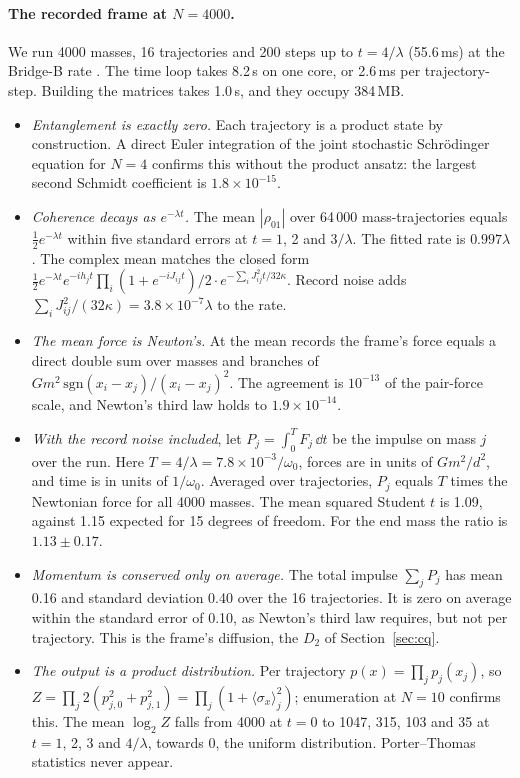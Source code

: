\paragraph{The recorded frame at $N=4000$.} We run 4000 masses, 16 trajectories and 200 steps up to $t=4/\lambda$ (55.6\,ms) at the Bridge-B
rate . The time loop takes 8.2\,s on one core, or 2.6\,ms per trajectory-step. Building the matrices takes 1.0\,s, and they
occupy 384\,MB.
\begin{itemize}[nosep]
\item \emph{Entanglement is exactly zero.} Each trajectory is a product state by construction. A direct Euler integration of the joint
stochastic Schr\"odinger equation for $N=4$ confirms this without the product ansatz: the largest second Schmidt coefficient is
$1.8\times10^{-15}$.
\item \emph{Coherence decays as $e^{-\lambda t}$.} The mean $|\rho_{01}|$ over 64\,000 mass-trajectories equals $\tfrac12e^{-\lambda t}$ within
five standard errors at $t=1$, 2 and $3/\lambda$. The fitted rate is $0.997\lambda$. The complex mean matches the closed form
$\tfrac12e^{-\lambda t}e^{-ih_jt}\prod_i(1+e^{-iJ_{ij}t})/2\cdot e^{-\sum_iJ_{ij}^2t/32\kappa}$. Record noise adds
$\sum_iJ_{ij}^2/(32\kappa)=3.8\times10^{-7}\lambda$ to the rate.
\item \emph{The mean force is Newton's.} At the mean records the frame's force equals a direct double sum over masses and branches of
$Gm^2\,\mathrm{sgn}(x_i-x_j)/(x_i-x_j)^2$. The agreement is $10^{-13}$ of the pair-force scale, and Newton's third law holds to
$1.9\times10^{-14}$.
\item \emph{With the record noise included}, let $P_j=\int_0^TF_j\,\dd t$ be the impulse on mass $j$ over the run. Here
$T=4/\lambda=7.8\times10^{-3}/\omega_0$, forces are in units of $Gm^2/d^2$, and time is in units of $1/\omega_0$. Averaged over trajectories,
$P_j$ equals $T$ times the Newtonian force for all 4000 masses. The mean squared Student $t$ is 1.09, against 1.15 expected for 15 degrees of
freedom. For the end mass the ratio is $1.13\pm0.17$.
\item \emph{Momentum is conserved only on average.} The total impulse $\sum_jP_j$ has mean 0.16 and standard deviation 0.40 over the 16
trajectories. It is zero on average within the standard error of 0.10, as Newton's third law requires, but not per trajectory. This is the
frame's diffusion, the $D_2$ of Section~\ref{sec:cq}.
\item \emph{The output is a product distribution.} Per trajectory $p(x)=\prod_jp_j(x_j)$, so
$Z=\prod_j2(p_{j,0}^2+p_{j,1}^2)=\prod_j(1+\langle\sigma_x\rangle_j^2)$; enumeration at $N=10$ confirms this. The mean $\log_2Z$ falls from
4000 at $t=0$ to 1047, 315, 103 and 35 at $t=1$, 2, 3 and $4/\lambda$, towards 0, the uniform distribution. Porter--Thomas statistics never
appear.
\end{itemize}

